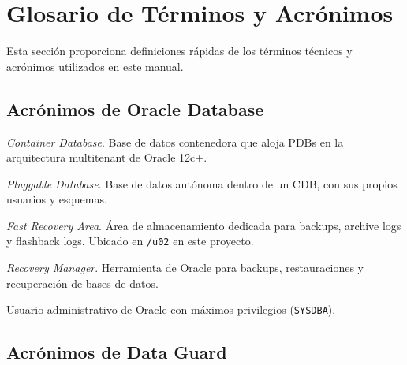 \documentclass[11pt, a4paper]{report}
\begin{document}
\newpage


\chapter{Glosario de Términos y Acrónimos}

Esta sección proporciona definiciones rápidas de los términos técnicos y acrónimos utilizados en este manual.

\section{Acrónimos de Oracle Database}

\begin{description}[style=nextline, leftmargin=3cm, font=\normalfont\bfseries]
    \item[CDB] \textit{Container Database}. Base de datos contenedora que aloja PDBs en la arquitectura multitenant de Oracle 12c+.

    \item[PDB] \textit{Pluggable Database}. Base de datos autónoma dentro de un CDB, con sus propios usuarios y esquemas.

    \item[FRA] \textit{Fast Recovery Area}. Área de almacenamiento dedicada para backups, archive logs y flashback logs. Ubicado en \texttt{/u02} en este proyecto.

    \item[RMAN] \textit{Recovery Manager}. Herramienta de Oracle para backups, restauraciones y recuperación de bases de datos.

    \item[SYS] Usuario administrativo de Oracle con máximos privilegios (\texttt{SYSDBA}).
\end{description}

\section{Acrónimos de Data Guard}
\end{document}
